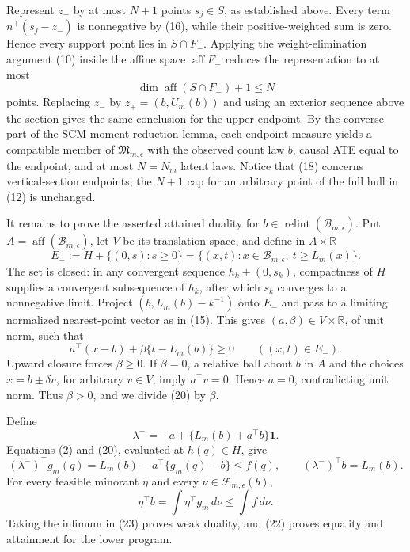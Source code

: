 Represent \(z_-\) by at most \(N+1\) points \(s_j\in S\), as established above.  Every term \(n^{\top}(s_j-z_-)\) is nonnegative by (16), while their positive-weighted sum is zero.  Hence every support point lies in \(S\cap F_-\).  Applying the weight-elimination argument (10) inside the affine space \(\operatorname{aff}F_-\) reduces the representation to at most
\[
 \dim\operatorname{aff}(S\cap F_-)+1\leq N
\tag{18}
\]
points.  Replacing \(z_-\) by \(z_+=(b,U_m(b))\) and using an exterior sequence above the section gives the same conclusion for the upper endpoint.  By the converse part of the SCM moment-reduction lemma, each endpoint measure yields a compatible member of \(\mathfrak M_{m,\epsilon}\) with the observed count law \(b\), causal ATE equal to the endpoint, and at most \(N=N_m\) latent laws.  Notice that (18) concerns vertical-section endpoints; the \(N+1\) cap for an arbitrary point of the full hull in (12) is unchanged.

It remains to prove the asserted attained duality for \(b\in\operatorname{relint}(\mathcal B_{m,\epsilon})\).  Put \(A=\operatorname{aff}(\mathcal B_{m,\epsilon})\), let \(V\) be its translation space, and define in \(A\times\mathbb R\)
\[
 E_-:=H+\{(0,s):s\geq0\}
 =\{(x,t):x\in\mathcal B_{m,\epsilon},\ t\geq L_m(x)\}.
\tag{19}
\]
The set is closed: in any convergent sequence \(h_k+(0,s_k)\), compactness of \(H\) supplies a convergent subsequence of \(h_k\), after which \(s_k\) converges to a nonnegative limit.  Project \((b,L_m(b)-k^{-1})\) onto \(E_-\) and pass to a limiting normalized nearest-point vector as in (15).  This gives \((a,\beta)\in V\times\mathbb R\), of unit norm, such that
\[
 a^{\top}(x-b)+\beta\{t-L_m(b)\}\geq0
 \qquad((x,t)\in E_-).
\tag{20}
\]
Upward closure forces \(\beta\geq0\).  If \(\beta=0\), a relative ball about \(b\) in \(A\) and the choices \(x=b\pm\delta v\), for arbitrary \(v\in V\), imply \(a^{\top}v=0\).  Hence \(a=0\), contradicting unit norm.  Thus \(\beta>0\), and we divide (20) by \(\beta\).

Define
\[
 \lambda^-=-a+\{L_m(b)+a^{\top}b\}\mathbf 1.
\tag{21}
\]
Equations (2) and (20), evaluated at \(h(q)\in H\), give
\[
 (\lambda^-)^{\top}g_m(q)
 =L_m(b)-a^{\top}\{g_m(q)-b\}\leq f(q),
 \qquad
 (\lambda^-)^{\top}b=L_m(b).
\tag{22}
\]
For every feasible minorant \(\eta\) and every \(\nu\in\mathcal F_{m,\epsilon}(b)\),
\[
 \eta^{\top}b=\int\eta^{\top}g_m\,d\nu
 \leq\int f\,d\nu.
\tag{23}
\]
Taking the infimum in (23) proves weak duality, and (22) proves equality and attainment for the lower program.

